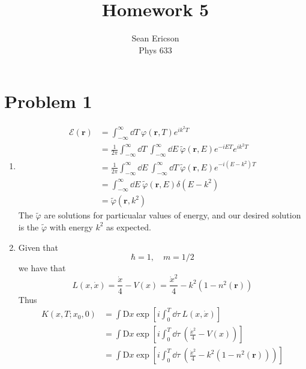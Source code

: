 \documentclass[12pt]{article}
\newcommand{\fullint}{\int_{-\infty}^\infty}
\newcommand{\fullintd}[1]{\fullint\dd#1\:}
\newcommand{\cint}[2]{\int_{#1}^{#2}}
\newcommand{\cintd}[3]{\cint{#1}{#2}\dd#3\:}
\begin{document}
	
\title{Homework 5}
\author{Sean Ericson \\ Phys 633}
\maketitle

\section*{Problem 1}
\begin{enumerate}[label=(\alph*)]
    \item
    \begin{align*}
        \mathscr{E}(\mathbf{r}) &= \fullintd{T}\varphi(\mathbf{r}, T)e^{ik^2T} \\
        &= \frac{1}{2\pi}\fullintd{T}\fullintd{E}\tilde{\varphi}(\mathbf{r},E)e^{-iET}e^{ik^2T} \\
        &= \frac{1}{2\pi}\fullintd{E}\fullintd{T}\tilde{\varphi}(\mathbf{r},E)e^{-i(E-k^2)T} \\
        &= \fullintd{E}\tilde{\varphi}(\mathbf{r},E)\delta(E - k^2) \\
        &= \tilde{\varphi}(\mathbf{r},k^2)
    \end{align*}
    The $\tilde{\varphi}$ are solutions for particualar values of energy, and our desired solution is the $\tilde{\varphi}$ with energy $k^2$ as expected.

    \item Given that 
    \[ \hbar = 1, \quad m = 1/2 \]
    we have that
    \[ L(x,\dot{x}) = \frac{\dot{x}}{4} - V(x) = \frac{\dot{x}^2}{4} - k^2(1 - n^2(\mathbf{r})) \]
    Thus
    \begin{align*}
        K(x,T;x_0,0) &= \int \text{D}x \exp[i\cintd{0}{T}{\tau}L(x,\dot{x})] \\
        &= \int \text{D}x \exp[i\cintd{0}{T}{\tau}\left(\frac{\dot{x}^2}{4} - V(x)\right)] \\
        &= \int \text{D}x \exp[i\cintd{0}{T}{\tau}\left(\frac{\dot{x}^2}{4} -k^2(1-n^2(\mathbf{r}))\right)]
    \end{align*}


\end{enumerate}
\end{document}
